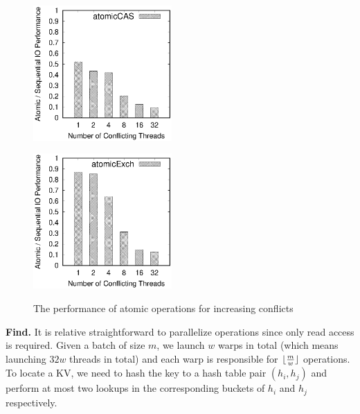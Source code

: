 \begin{figure}[t]
	\centering
	\hspace{-3em}
	\begin{minipage}{0.5\linewidth}
		\label{fig:atomicCAS}
		\includegraphics[width=5.3cm]{exp/atomic/atomicCAS.eps}
	\end{minipage}
	\hspace{-1em}
	\begin{minipage}{0.5\linewidth}
		\label{fig:atomicExch}
		\includegraphics[width=5.3cm]{exp/atomic/atomicExch.eps}
	\end{minipage}
	\caption{The performance of atomic operations for increasing conflicts}
	\label{fig:atomic}
\end{figure}

\vspace{1mm}\noindent\textbf{Find.} It is relative straightforward to parallelize  operations since only read access is required. 
Given a batch of size $m$, we launch $w$ warps in total (which means launching $32w$ threads in total) and each warp is responsible for $\lfloor\frac{m}{w}\rfloor$  operations. To locate a KV, we need to hash the key to a hash table pair $(h_i,h_j)$ and perform at most two lookups in the corresponding buckets of $h_i$ and $h_j$ respectively. 




